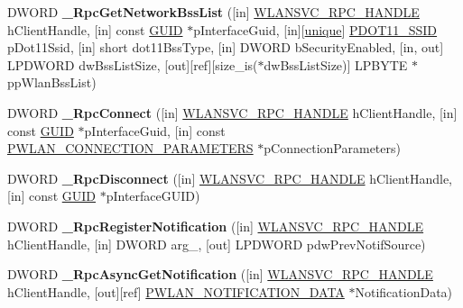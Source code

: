 \begin{DoxyCompactItemize}
D\+W\+O\+RD {\bfseries \+\_\+\+Rpc\+Get\+Network\+Bss\+List} (\mbox{[}in\mbox{]} \hyperlink{interfacevoid}{W\+L\+A\+N\+S\+V\+C\+\_\+\+R\+P\+C\+\_\+\+H\+A\+N\+D\+LE} h\+Client\+Handle, \mbox{[}in\mbox{]} const \hyperlink{interface_g_u_i_d}{G\+U\+ID} $\ast$p\+Interface\+Guid, \mbox{[}in\mbox{]}\mbox{[}\hyperlink{interfaceunique}{unique}\mbox{]} \hyperlink{struct___d_o_t11___s_s_i_d}{P\+D\+O\+T11\+\_\+\+S\+S\+ID} p\+Dot11\+Ssid, \mbox{[}in\mbox{]} short dot11\+Bss\+Type, \mbox{[}in\mbox{]} D\+W\+O\+RD b\+Security\+Enabled, \mbox{[}in, out\mbox{]} L\+P\+D\+W\+O\+RD dw\+Bss\+List\+Size, \mbox{[}out\mbox{]}\mbox{[}ref\mbox{]}\mbox{[}size\+\_\+is($\ast$dw\+Bss\+List\+Size)\mbox{]} L\+P\+B\+Y\+TE $\ast$pp\+Wlan\+Bss\+List)
\item 
\mbox{\label{interfacewlansvc__interface_aec9f090ee7465128142624c20933ae5f}} 
D\+W\+O\+RD {\bfseries \+\_\+\+Rpc\+Connect} (\mbox{[}in\mbox{]} \hyperlink{interfacevoid}{W\+L\+A\+N\+S\+V\+C\+\_\+\+R\+P\+C\+\_\+\+H\+A\+N\+D\+LE} h\+Client\+Handle, \mbox{[}in\mbox{]} const \hyperlink{interface_g_u_i_d}{G\+U\+ID} $\ast$p\+Interface\+Guid, \mbox{[}in\mbox{]} const \hyperlink{struct___w_l_a_n___c_o_n_n_e_c_t_i_o_n___p_a_r_a_m_e_t_e_r_s}{P\+W\+L\+A\+N\+\_\+\+C\+O\+N\+N\+E\+C\+T\+I\+O\+N\+\_\+\+P\+A\+R\+A\+M\+E\+T\+E\+RS} $\ast$p\+Connection\+Parameters)
\item 
\mbox{\label{interfacewlansvc__interface_a83e11c314162f73ad6418e5a5f39f444}} 
D\+W\+O\+RD {\bfseries \+\_\+\+Rpc\+Disconnect} (\mbox{[}in\mbox{]} \hyperlink{interfacevoid}{W\+L\+A\+N\+S\+V\+C\+\_\+\+R\+P\+C\+\_\+\+H\+A\+N\+D\+LE} h\+Client\+Handle, \mbox{[}in\mbox{]} const \hyperlink{interface_g_u_i_d}{G\+U\+ID} $\ast$p\+Interface\+G\+U\+ID)
\item 
\mbox{\label{interfacewlansvc__interface_aa16100643f655ad30729fe8972d85318}} 
D\+W\+O\+RD {\bfseries \+\_\+\+Rpc\+Register\+Notification} (\mbox{[}in\mbox{]} \hyperlink{interfacevoid}{W\+L\+A\+N\+S\+V\+C\+\_\+\+R\+P\+C\+\_\+\+H\+A\+N\+D\+LE} h\+Client\+Handle, \mbox{[}in\mbox{]} D\+W\+O\+RD arg\+\_, \mbox{[}out\mbox{]} L\+P\+D\+W\+O\+RD pdw\+Prev\+Notif\+Source)
\item 
\mbox{\label{interfacewlansvc__interface_a1e67d97841b2aa2418b1edb1ba191c42}} 
D\+W\+O\+RD {\bfseries \+\_\+\+Rpc\+Async\+Get\+Notification} (\mbox{[}in\mbox{]} \hyperlink{interfacevoid}{W\+L\+A\+N\+S\+V\+C\+\_\+\+R\+P\+C\+\_\+\+H\+A\+N\+D\+LE} h\+Client\+Handle, \mbox{[}out\mbox{]}\mbox{[}ref\mbox{]} \hyperlink{struct___l2___n_o_t_i_f_i_c_a_t_i_o_n___d_a_t_a}{P\+W\+L\+A\+N\+\_\+\+N\+O\+T\+I\+F\+I\+C\+A\+T\+I\+O\+N\+\_\+\+D\+A\+TA} $\ast$Notification\+Data)

\end{DoxyCompactItemize}
